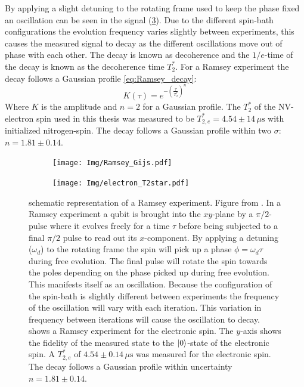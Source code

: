 By applying a slight detuning to the rotating frame used to keep the phase fixed an oscillation can be seen in the signal (\cref{fig:electron_T2*}).
Due to the different spin-bath configurations the evolution frequency varies slightly between experiments, this causes the measured signal to decay as the different oscillations move out of phase with each other.
The decay is known as decoherence and the $1/e$-time of the decay is known as the decoherence time $T_2^*$.
For a Ramsey experiment the decay follows a Gaussian profile \cref{eq:Ramsey_decay}:
\begin{equation}
    K(\tau) = e^{-(\tfrac{\tau}{T_{2}^*})^n}
    \label{eq:Ramsey_decay}
\end{equation}
Where $K$ is the amplitude and $n =2$ for a Gaussian profile.
The $T_2^*$ of the NV-electron spin used in this thesis was measured to be $T_{2,e}^* = 4.54 \pm 14\, \mu\mathrm{s}$ with initialized nitrogen-spin.
The decay follows a Gaussian profile within two $\sigma$: $n = 1.81 \pm 0.14$.

\begin{figure}[htbp]
    \centering
    \begin{subfigure}[t]{0.49\textwidth}\centering
        \caption{}
        \texttt{[image: Img/Ramsey\_Gijs.pdf]}
        \label{fig:Ramsey_gijs}
    \end{subfigure}
    \begin{subfigure}[t]{0.49\textwidth}\centering
        \caption{}
        \texttt{[image: Img/electron\_T2star.pdf]}
        \label{fig:electron_T2*}
    \end{subfigure}
        \caption{
        \textbf{} schematic representation of a Ramsey experiment. Figure from \citet{Lange2012Quantum}.
        In a Ramsey experiment a qubit is brought into the $xy$-plane by a $\pi/2$-pulse where it evolves freely for a time $\tau$ before being subjected to a final $\pi/2$ pulse to read out its $x$-component.
        By applying a detuning ($\omega_d$) to the rotating frame the spin will pick up a phase $\phi = \omega_d \tau$ during free evolution.
        The final pulse will rotate the spin towards the poles depending on the phase picked up during free evolution.
        This manifests itself as an oscillation.
        Because the configuration of the spin-bath is slightly different between experiments the frequency of the oscillation will vary with each iteration.
        This variation in frequency between iterations will cause the oscillation to decay.
         shows a Ramsey experiment for the electronic spin.
        The $y$-axis shows the fidelity of the measured state to the ${\left\vert{0}\right\rangle}$-state of the electronic spin.
        A $T_{2,e}^*$ of $4.54 \pm 0.14\, \mu\mathrm{s}$ was measured for the electronic spin. The decay follows a Gaussian profile within uncertainty $n = 1.81 \pm 0.14$. }
\end{figure}


